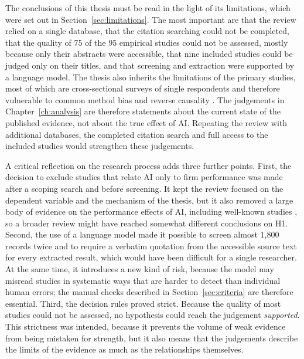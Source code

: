 The conclusions of this thesis must be read in the light of its limitations, which were set out in Section~\ref{sec:limitations}. The most important are that the review relied on a single database, that the citation searching could not be completed, that the quality of 75 of the 95 empirical studies could not be assessed, mostly because only their abstracts were accessible, that nine included studies could be judged only on their titles, and that screening and extraction were supported by a language model. The thesis also inherits the limitations of the primary studies, most of which are cross-sectional surveys of single respondents and therefore vulnerable to common method bias and reverse causality \parencite{podsakoff2024, hill2021}. The judgements in Chapter~\ref{ch:analysis} are therefore statements about the current state of the published evidence, not about the true effect of AI. Repeating the review with additional databases, the completed citation search and full access to the included studies would strengthen these judgements.

A critical reflection on the research process adds three further points. First, the decision to exclude studies that relate AI only to firm performance was made after a scoping search and before screening. It kept the review focused on the dependent variable and the mechanism of the thesis, but it also removed a large body of evidence on the performance effects of AI, including well-known studies \parencite{mikalef2021ai, chen2022}, so a broader review might have reached somewhat different conclusions on H1. Second, the use of a language model made it possible to screen almost 1,800 records twice and to require a verbatim quotation from the accessible source text for every extracted result, which would have been difficult for a single researcher. At the same time, it introduces a new kind of risk, because the model may misread studies in systematic ways that are harder to detect than individual human errors; the manual checks described in Section~\ref{sec:criteria} are therefore essential. Third, the decision rules proved strict. Because the quality of most studies could not be assessed, no hypothesis could reach the judgement \textit{supported}. This strictness was intended, because it prevents the volume of weak evidence from being mistaken for strength, but it also means that the judgements describe the limits of the evidence as much as the relationships themselves.

